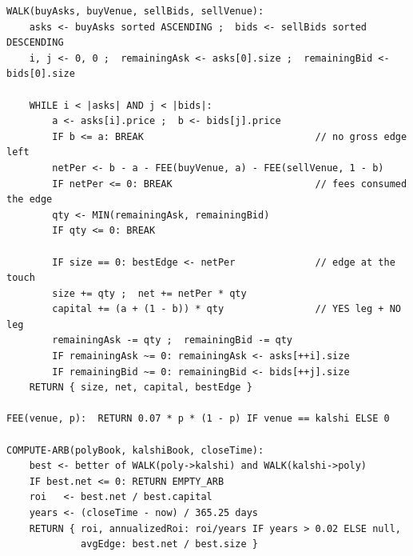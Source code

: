 \documentclass[11pt,a4paper]{article}
\begin{document}
\begin{lstlisting}
WALK(buyAsks, buyVenue, sellBids, sellVenue):
    asks <- buyAsks sorted ASCENDING ;  bids <- sellBids sorted DESCENDING
    i, j <- 0, 0 ;  remainingAsk <- asks[0].size ;  remainingBid <- bids[0].size

    WHILE i < |asks| AND j < |bids|:
        a <- asks[i].price ;  b <- bids[j].price
        IF b <= a: BREAK                              // no gross edge left
        netPer <- b - a - FEE(buyVenue, a) - FEE(sellVenue, 1 - b)
        IF netPer <= 0: BREAK                         // fees consumed the edge
        qty <- MIN(remainingAsk, remainingBid)
        IF qty <= 0: BREAK

        IF size == 0: bestEdge <- netPer              // edge at the touch
        size += qty ;  net += netPer * qty
        capital += (a + (1 - b)) * qty                // YES leg + NO leg
        remainingAsk -= qty ;  remainingBid -= qty
        IF remainingAsk ~= 0: remainingAsk <- asks[++i].size
        IF remainingBid ~= 0: remainingBid <- bids[++j].size
    RETURN { size, net, capital, bestEdge }

FEE(venue, p):  RETURN 0.07 * p * (1 - p) IF venue == kalshi ELSE 0

COMPUTE-ARB(polyBook, kalshiBook, closeTime):
    best <- better of WALK(poly->kalshi) and WALK(kalshi->poly)
    IF best.net <= 0: RETURN EMPTY_ARB
    roi   <- best.net / best.capital
    years <- (closeTime - now) / 365.25 days
    RETURN { roi, annualizedRoi: roi/years IF years > 0.02 ELSE null,
             avgEdge: best.net / best.size }
\end{lstlisting}
\end{document}
